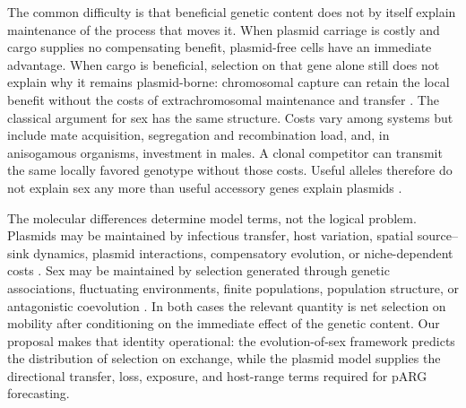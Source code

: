 \documentclass[12pt,a4paper]{article}
\begin{document}
The common difficulty is that beneficial genetic content does not by itself explain maintenance of the process that moves it. When plasmid carriage is costly and cargo supplies no compensating benefit, plasmid-free cells have an immediate advantage. When cargo is beneficial, selection on that gene alone still does not explain why it remains plasmid-borne: chromosomal capture can retain the local benefit without the costs of extrachromosomal maintenance and transfer \citep{stewartlevin1977,bergstrom2000,brockhurst2022}. The classical argument for sex has the same structure. Costs vary among systems but include mate acquisition, segregation and recombination load, and, in anisogamous organisms, investment in males. A clonal competitor can transmit the same locally favored genotype without those costs. Useful alleles therefore do not explain sex any more than useful accessory genes explain plasmids \citep{maynardsmith1971,maynardsmith1978,williams1975,ottolenormand2002,lehtonen2012}.

The molecular differences determine model terms, not the logical problem. Plasmids may be maintained by infectious transfer, host variation, spatial source--sink dynamics, plasmid interactions, compensatory evolution, or niche-dependent costs \citep{brockhurst2022}. Sex may be maintained by selection generated through genetic associations, fluctuating environments, finite populations, population structure, or antagonistic coevolution \citep{ottolenormand2002,otto2009}. In both cases the relevant quantity is net selection on mobility after conditioning on the immediate effect of the genetic content. Our proposal makes that identity operational: the evolution-of-sex framework predicts the distribution of selection on exchange, while the plasmid model supplies the directional transfer, loss, exposure, and host-range terms required for pARG forecasting.
\end{document}
